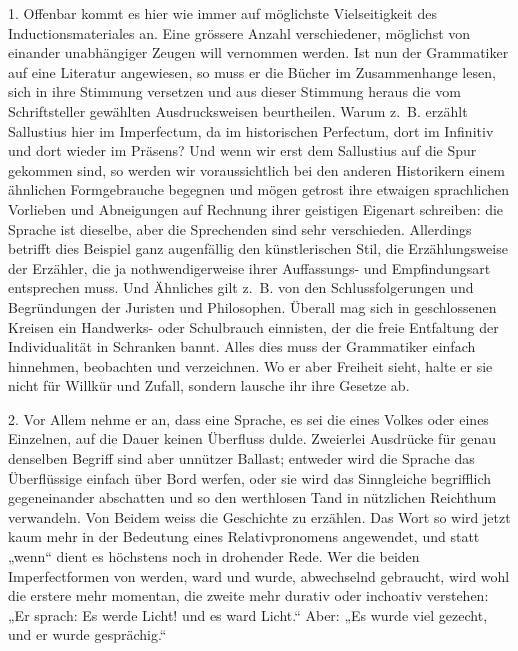 1. Offenbar kommt es hier wie immer auf möglichste Vielseitigkeit des Inductionsmateriales an. Eine grössere Anzahl verschiedener, möglichst von einander unabhängiger Zeugen will vernommen werden. Ist nun der Grammatiker auf eine Literatur angewiesen, so muss er die Bücher im Zusammenhange lesen, sich in ihre Stimmung versetzen und aus dieser Stimmung heraus die vom Schriftsteller gewählten Ausdrucksweisen beurtheilen. Warum z.~B. erzählt Sallustius hier im Imperfectum, da im historischen Perfectum, dort im Infinitiv und dort wieder im Präsens? Und wenn wir erst dem Sallustius auf die Spur gekommen sind, so werden wir voraussichtlich bei den anderen Historikern einem \label{sp.100} ähnlichen Formgebrauche begegnen und mögen getrost ihre etwaigen sprachlichen Vorlieben und Abneigungen auf Rechnung ihrer geistigen Eigenart schreiben: die Sprache ist dieselbe, aber die Sprechenden sind sehr verschieden. Allerdings betrifft dies Beispiel ganz augenfällig den künstlerischen Stil, die Erzählungsweise der Erzähler, die ja nothwendigerweise ihrer Auffassungs- und Empfindungsart entsprechen muss. Und \label{fp.104} Ähnliches gilt z.~B. von den Schlussfolgerungen und Begründungen der Juristen und Philosophen. Überall mag sich in geschlossenen Kreisen ein Handwerks- oder Schulbrauch einnisten, der die freie Entfaltung der Individualität in Schranken bannt. Alles dies muss der Grammatiker einfach hinnehmen, beobachten und verzeichnen. Wo er aber Freiheit sieht, halte er sie nicht für Willkür und Zufall, sondern lausche ihr ihre Gesetze ab.

2. Vor Allem nehme er an, dass eine Sprache, es sei die eines Volkes oder eines Einzelnen, auf die Dauer keinen Überfluss dulde. Zweierlei Ausdrücke für genau denselben Begriff sind aber unnützer Ballast; entweder wird die Sprache das Überflüssige einfach über Bord werfen, oder sie wird das Sinngleiche begrifflich gegeneinander abschatten und so den werthlosen Tand in nützlichen Reichthum verwandeln. Von Beidem weiss die Geschichte zu erzählen. Das Wort so wird jetzt kaum mehr in der Bedeutung eines Relativpronomens angewendet, und statt „wenn“ dient es höchstens noch in drohender Rede. Wer die beiden Imperfectformen von werden, ward und wurde, abwechselnd gebraucht, wird wohl die erstere mehr momentan, die zweite mehr durativ oder inchoativ verstehen: „Er sprach: Es werde Licht! und es ward Licht.“ Aber: „Es wurde viel gezecht, und er wurde gesprächig.“

